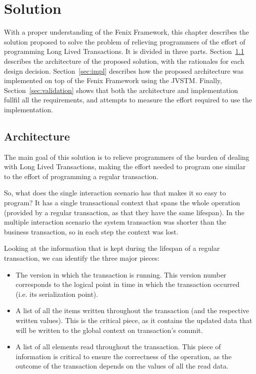 \chapter{Solution}
\label{chap:solution}

With a proper understanding of the Fenix Framework, this chapter
describes the solution proposed to solve the problem of relieving
programmers of the effort of programming Long Lived Transactions. It
is divided in three parts. Section~\ref{sec:arch} describes the
architecture of the proposed solution, with the rationales for each
design decision. Section~\ref{sec:impl} describes how the proposed
architecture was implemented on top of the Fenix Framework using the
JVSTM. Finally, Section~\ref{sec:validation} shows that both the
architecture and implementation fullfil all the requirements, and
attempts to measure the effort required to use the implementation.

\section{Architecture}
\label{sec:arch}

The main goal of this solution is to relieve programmers of the burden
of dealing with Long Lived Transactions, making the effort needed to
program one similar to the effort of programming a regular
transaction.

So, what does the single interaction scenario has that makes it so
easy to program? It has a single transactional context that spans the
whole operation (provided by a regular transaction, as that they have
the same lifespan). In the multiple interaction scenario the system
transaction was shorter than the business transaction, so in each step
the context was lost.

Looking at the information that is kept during the lifespan of a
regular transaction, we can identify the three major pieces:

\begin{itemize}
\item The version in which the transaction is running. This version
  number corresponds to the logical point in time in which the
  transaction occurred (i.e. its serialization point).
\item A list of all the items written throughout the transaction (and
  the respective written values). This is the critical piece, as it
  contains the updated data that will be written to the global context
  on transaction's commit.
\item A list of all elements read throughout the transaction. This
  piece of information is critical to ensure the correctness of the
  operation, as the outcome of the transaction depends on the values
  of all the read data.
\end{itemize}

